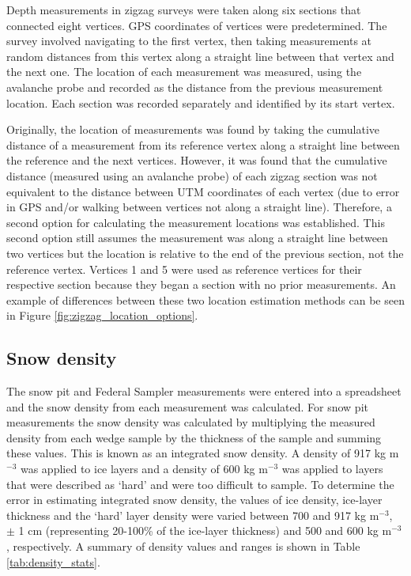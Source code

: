 \documentclass{sfuthesis}
\begin{document}
Depth measurements in zigzag surveys were taken along six sections that connected eight vertices. GPS coordinates of vertices were predetermined. The survey involved navigating to the first vertex, then taking measurements at random distances from this vertex along a straight line between that vertex and the next one. The location of each measurement was measured, using the avalanche probe and recorded as the distance from the previous measurement location. Each section was recorded separately and identified by its start vertex. 

Originally, the location of measurements was found by taking the cumulative distance of a measurement from its reference vertex along a straight line between the reference and the next vertices. However, it was found that the cumulative distance (measured using an avalanche probe) of each zigzag section was not equivalent to the distance between UTM coordinates of each vertex (due to error in GPS and/or walking between vertices not along a straight line). Therefore, a second option for calculating the measurement locations was established. This second option still assumes the measurement was along a straight line between two vertices but the location is relative to the end of the previous section, not the reference vertex. Vertices 1 and 5 were used as reference vertices for their respective section because they began a section with no prior measurements. An example of differences between these two location estimation methods can be seen in Figure \ref{fig:zigzag_location_options}.


\subsection{Snow density}

The snow pit and Federal Sampler measurements were entered into a spreadsheet and the snow density from each measurement was calculated. For snow pit measurements the snow density was calculated by multiplying the measured density from each wedge sample by the thickness of the sample and summing these values. This is known as an integrated snow density. A density of 917 kg m$^{-3}$ was applied to ice layers and a density of 600 kg m$^{-3}$ was applied to layers that were described as `hard' and were too difficult to sample. To determine the error in estimating integrated snow density, the values of ice density, ice-layer thickness and the `hard' layer density were varied between 700 and 917 kg m$^{-3}$, $\pm$ 1 cm (representing 20-100\% of the ice-layer thickness) and 500 and 600 kg m$^{-3}$, respectively.  A summary of density values and ranges is shown in Table \ref{tab:density_stats}.
\end{document}
